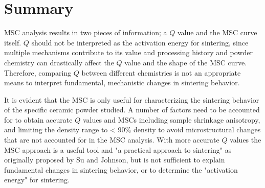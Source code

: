 \section{Summary}

MSC analysis results in two pieces of information; a $Q$ value and the MSC curve itself. $Q$ should not be interpreted as the activation energy for sintering, since multiple mechanisms contribute to its value and processing history and powder chemistry can drastically affect the $Q$ value and the shape of the MSC curve. Therefore, comparing $Q$ between different chemistries is not an appropriate means to interpret fundamental, mechanistic changes in sintering behavior. 

It is evident that the MSC is only useful for characterizing the sintering behavior of the specific ceramic powder studied. A number of factors need to be accounted for to obtain accurate $Q$ values and MSCs including sample shrinkage anisotropy, and limiting the density range to < 90\% density to avoid microstructural changes that are not accounted for in the MSC analysis. With more accurate $Q$ values the MSC approach is a useful tool and "a practical approach to sintering" as originally proposed by Su and Johnson, but is not sufficient to explain fundamental changes in sintering behavior, or to determine the "activation energy" for sintering.


